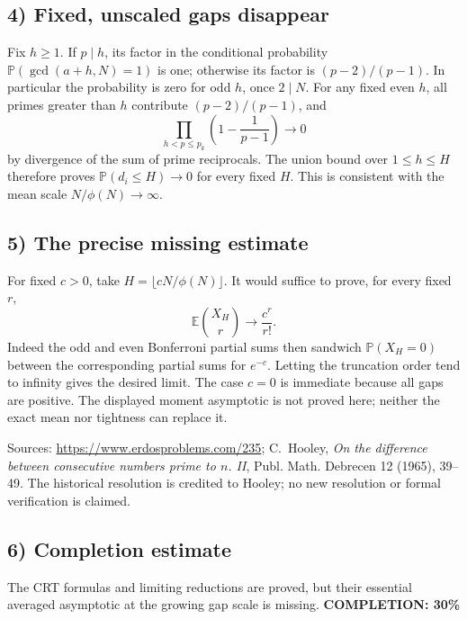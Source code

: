 \subsection{4) Fixed, unscaled gaps disappear}
Fix $h\geq1$. If $p\mid h$, its factor in the conditional
probability $\mathbb P(\gcd(a+h,N)=1)$ is one; otherwise its
factor is $(p-2)/(p-1)$. In particular the probability is zero
for odd $h$, once $2\mid N$. For any fixed even $h$, all primes
greater than $h$ contribute $(p-2)/(p-1)$, and
\[
 \prod_{h<p\leq p_k}\left(1-\frac1{p-1}\right)\longrightarrow0
\]
by divergence of the sum of prime reciprocals. The union bound
over $1\leq h\leq H$ therefore proves
$\mathbb P(d_i\leq H)\to0$ for every fixed $H$.
This is consistent with the mean scale $N/\phi(N)\to\infty$.

\subsection{5) The precise missing estimate}
For fixed $c>0$, take $H=\lfloor cN/\phi(N)\rfloor$.
It would suffice to prove, for every fixed $r$,
\[
 \mathbb E\binom{X_H}{r}\longrightarrow\frac{c^r}{r!}.
\]
Indeed the odd and even Bonferroni partial sums then sandwich
$\mathbb P(X_H=0)$ between the corresponding partial sums for
$e^{-c}$. Letting the truncation order tend to infinity gives the
desired limit. The case $c=0$ is immediate because all gaps are
positive. The displayed moment asymptotic is not proved here;
neither the exact mean nor tightness can replace it.

Sources: \url{https://www.erdosproblems.com/235};
C.~Hooley, \emph{On the difference between consecutive numbers
prime to $n$. II}, Publ. Math. Debrecen 12 (1965), 39--49.
The historical resolution is credited to Hooley; no new resolution
or formal verification is claimed.

\subsection{6) Completion estimate}
The CRT formulas and limiting reductions are proved, but their
essential averaged asymptotic at the growing gap scale is missing.
\textbf{COMPLETION: 30\%}
